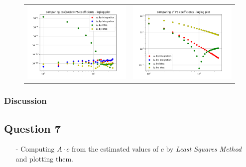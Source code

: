 \documentclass[11pt, a4paper, twoside]{article}
\begin{document}
\begin{figure}[H]
\begin{tabular}{cc}
                        \includegraphics[scale=0.5]{Plots/Figure 5.1.png} &
                        \includegraphics[scale=0.5]{Plots/Figure 6.1.png}\\
                    \end{tabular}
                \end{figure}
            \subsubsection{Discussion}
        \subsection{Question 7}
            \begin{itemize}
                \item[-] Computing $A\cdot c$ from the estimated values of $c$ by \textit{Least Squares Method} and plotting them.
            \end{itemize}
\end{document}
